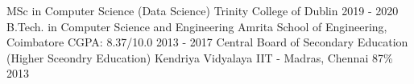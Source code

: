 \begin{cventries}
  \cventry
    {MSc in Computer Science (Data Science)}
    {Trinity College of Dublin}
    {\empty}
    {2019 - 2020}
    {\empty}
  \cventry
    {B.Tech. in Computer Science and Engineering}
    {Amrita School of Engineering, Coimbatore}
    {CGPA: 8.37/10.0}
    {2013 - 2017}
    {\empty}
  \cventry
    {Central Board of Secondary Education (Higher Sceondry Education)}
    {Kendriya Vidyalaya IIT - Madras, Chennai}
    {87\%}
    {2013}
    {\empty}
\end{cventries}
